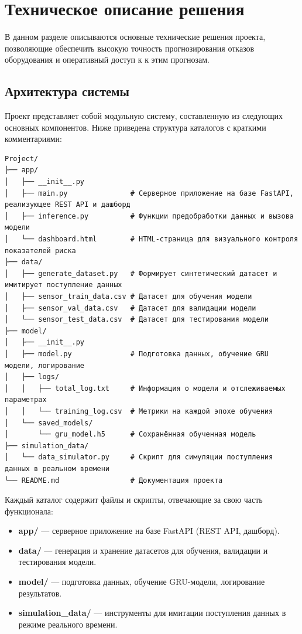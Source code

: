 \documentclass[a4paper,12pt]{article}
\begin{document}
\section{Техническое описание решения}
\begin{flushleft}

В данном разделе описываются основные технические решения проекта, позволяющие обеспечить высокую точность прогнозирования отказов оборудования и оперативный доступ к к этим прогнозам.

\subsection{Архитектура системы}
Проект представляет собой модульную систему, составленную из следующих основных компонентов. Ниже приведена структура каталогов с краткими комментариями:


\begin{lstlisting}
Project/
├── app/
│   ├── __init__.py
│   ├── main.py               # Серверное приложение на базе FastAPI, реализующее REST API и дашборд
│   ├── inference.py          # Функции предобработки данных и вызова модели
│   └── dashboard.html        # HTML-страница для визуального контроля показателей риска
├── data/
│   ├── generate_dataset.py   # Формирует синтетический датасет и имитирует поступление данных
│   ├── sensor_train_data.csv # Датасет для обучения модели
│   ├── sensor_val_data.csv   # Датасет для валидации модели
│   └── sensor_test_data.csv  # Датасет для тестирования модели
├── model/
│   ├── __init__.py
│   ├── model.py              # Подготовка данных, обучение GRU модели, логирование
│   ├── logs/
│   │   ├── total_log.txt     # Информация о модели и отслеживаемых параметрах
│   │   └── training_log.csv  # Метрики на каждой эпохе обучения
│   └── saved_models/
│       └── gru_model.h5      # Сохранённая обученная модель
├── simulation_data/
│   └── data_simulator.py     # Скрипт для симуляции поступления данных в реальном времени
└── README.md                 # Документация проекта
\end{lstlisting}

\noindent
Каждый каталог содержит файлы и скрипты, отвечающие за свою часть функционала:
\begin{itemize}
    \item \textbf{app/} --- серверное приложение на базе FastAPI (REST API, дашборд).
    \item \textbf{data/} --- генерация и хранение датасетов для обучения, валидации и тестирования модели.
    \item \textbf{model/} --- подготовка данных, обучение GRU-модели, логирование результатов.
    \item \textbf{simulation\_data/} --- инструменты для имитации поступления данных в режиме реального времени.
\end{itemize}



\end{flushleft}
\end{document}
